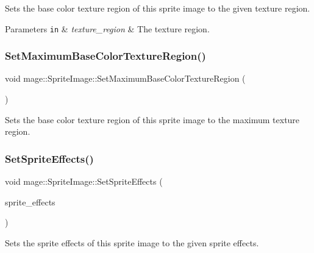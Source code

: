 Sets the base color texture region of this sprite image to the given texture region.


\begin{DoxyParams}[1]{Parameters}
\mbox{\tt in}  & {\em texture\+\_\+region} & The texture region. \\
\hline
\end{DoxyParams}
\hypertarget{classmage_1_1_sprite_image_aa08a58d1e94f8e26031b97b56b0c8c6a}{}\label{classmage_1_1_sprite_image_aa08a58d1e94f8e26031b97b56b0c8c6a} 
\subsubsection{\texorpdfstring{Set\+Maximum\+Base\+Color\+Texture\+Region()}{SetMaximumBaseColorTextureRegion()}}
{\footnotesize\ttfamily void mage\+::\+Sprite\+Image\+::\+Set\+Maximum\+Base\+Color\+Texture\+Region (\begin{DoxyParamCaption}{ }\end{DoxyParamCaption})\hspace{0.3cm}{\ttfamily [noexcept]}}

Sets the base color texture region of this sprite image to the maximum texture region. \hypertarget{classmage_1_1_sprite_image_a81f8297413245635b505374068abe588}{}\label{classmage_1_1_sprite_image_a81f8297413245635b505374068abe588} 
\subsubsection{\texorpdfstring{Set\+Sprite\+Effects()}{SetSpriteEffects()}}
{\footnotesize\ttfamily void mage\+::\+Sprite\+Image\+::\+Set\+Sprite\+Effects (\begin{DoxyParamCaption}\item[{\hyperlink{namespacemage_ad62ebdf0e7aae0caf1535a4ea3f056ea}{Sprite\+Effect}}]{sprite\+\_\+effects }\end{DoxyParamCaption})\hspace{0.3cm}{\ttfamily [noexcept]}}

Sets the sprite effects of this sprite image to the given sprite effects.


